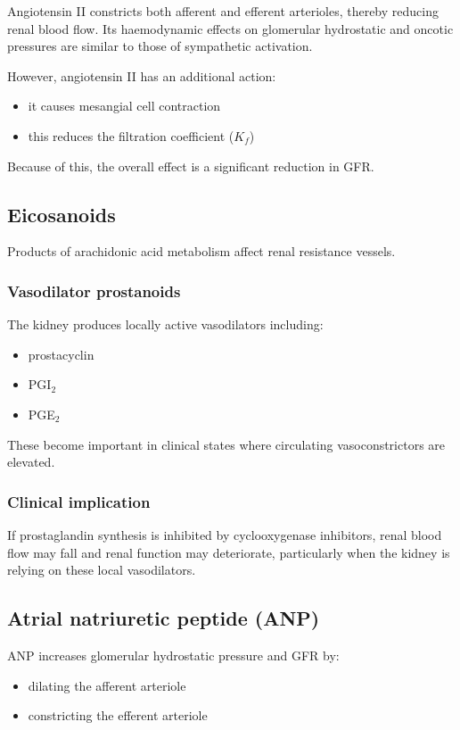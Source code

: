 \documentclass[11pt,a4paper]{article}
\begin{document}
Angiotensin II constricts both afferent and efferent arterioles, thereby reducing renal blood flow. Its haemodynamic effects on glomerular hydrostatic and oncotic pressures are similar to those of sympathetic activation.

However, angiotensin II has an additional action:
\begin{itemize}
    \item it causes mesangial cell contraction
    \item this reduces the filtration coefficient ($K_f$)
\end{itemize}

Because of this, the overall effect is a significant reduction in GFR.

\subsection{Eicosanoids}

Products of arachidonic acid metabolism affect renal resistance vessels.

\subsubsection{Vasodilator prostanoids}

The kidney produces locally active vasodilators including:
\begin{itemize}
    \item prostacyclin
    \item PGI$_2$
    \item PGE$_2$
\end{itemize}

These become important in clinical states where circulating vasoconstrictors are elevated.

\subsubsection{Clinical implication}

If prostaglandin synthesis is inhibited by cyclooxygenase inhibitors, renal blood flow may fall and renal function may deteriorate, particularly when the kidney is relying on these local vasodilators.

\subsection{Atrial natriuretic peptide (ANP)}

ANP increases glomerular hydrostatic pressure and GFR by:
\begin{itemize}
    \item dilating the afferent arteriole
    \item constricting the efferent arteriole
\end{itemize}
\end{document}
